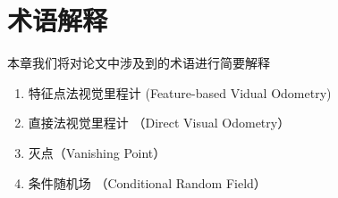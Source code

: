 \chapter{术语解释}
本章我们将对论文中涉及到的术语进行简要解释
\begin{enumerate}
    \item 特征点法视觉里程计 (Feature-based Vidual Odometry)
    \item 直接法视觉里程计 （Direct Visual Odometry）
    \item 灭点（Vanishing Point）
    \item 条件随机场 （Conditional Random Field）
\end{enumerate}